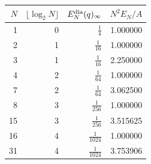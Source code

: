 \begin{tabular}{rrrr}
\toprule
$N$ & $\lfloor\log_2N\rfloor$ & $E_N^{\rm dia}(q)_\infty$ & $N^2E_N/A$ \\
\midrule
1 & 0 & $\frac{1}{4}$ & 1.000000 \\
2 & 1 & $\frac{1}{16}$ & 1.000000 \\
3 & 1 & $\frac{1}{16}$ & 2.250000 \\
4 & 2 & $\frac{1}{64}$ & 1.000000 \\
7 & 2 & $\frac{1}{64}$ & 3.062500 \\
8 & 3 & $\frac{1}{256}$ & 1.000000 \\
15 & 3 & $\frac{1}{256}$ & 3.515625 \\
16 & 4 & $\frac{1}{1024}$ & 1.000000 \\
31 & 4 & $\frac{1}{1024}$ & 3.753906 \\
\bottomrule
\end{tabular}
